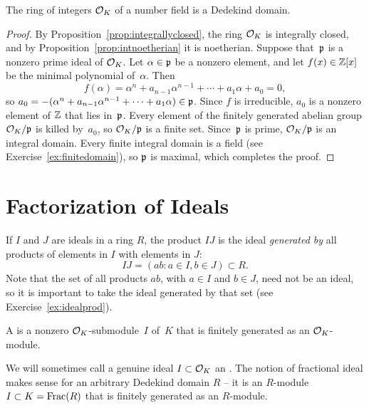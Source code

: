 \begin{proposition}
The ring of integers $\mathcal{O}_K$ of a number field is a Dedekind domain.
\end{proposition}
\begin{proof}
By Proposition~\ref{prop:integrallyclosed}, the ring $\mathcal{O}_K$ is
integrally closed, and by Proposition~\ref{prop:intnoetherian} it is
noetherian.  Suppose that~$\mathfrak{p}$ is a nonzero prime ideal of $\mathcal{O}_K$.
Let $\alpha\in \mathfrak{p}$ be a nonzero element, and let $f(x)\in\mathbb{Z}[x]$ be the
minimal polynomial of~$\alpha$.  Then
$$f(\alpha)=\alpha^n+a_{n-1}\alpha^{n-1}+\cdots+a_1\alpha+a_0=0,$$ so
$a_0 = -(\alpha^n+a_{n-1}\alpha^{n-1}+\cdots+a_1\alpha)\in \mathfrak{p}$.  Since
$f$ is irreducible, $a_0$ is a nonzero element of $\mathbb{Z}$ that lies
in~$\mathfrak{p}$.  Every element of the finitely generated abelian group
$\mathcal{O}_K/\mathfrak{p}$ is killed by~$a_0$, so $\mathcal{O}_K/\mathfrak{p}$ is a finite set.
Since~$\mathfrak{p}$ is prime, $\mathcal{O}_K/\mathfrak{p}$ is an integral domain.  Every finite
integral domain is a field (see Exercise~\ref{ex:finitedomain}), so
$\mathfrak{p}$ is maximal, which completes the proof.
\end{proof}

\section{Factorization of Ideals}

If $I$ and $J$ are ideals in a ring $R$, the product $IJ$ is the ideal
{\em generated by} all products of elements in $I$ with elements in $J$:
$$
  IJ = (ab : a\in I, b\in J) \subset R.
$$
Note that the set of all products $ab$, with $a\in I$ and $b\in J$,
need not be an ideal, so it is important to take the ideal generated
by that set (see Exercise~\ref{ex:idealprod}).

\begin{definition}\label{def:fracideal}
A  is a nonzero $\mathcal{O}_K$-submodule~$I$ of~$K$ that
is finitely generated as an $\mathcal{O}_K$-module.
\end{definition}
We will sometimes call a genuine ideal $I\subset \mathcal{O}_K$ an
.  The notion of fractional ideal makes
sense for an arbitrary Dedekind domain $R$ -- it is an
$R$-module $I\subset K=\operatorname{Frac}(R)$ that is finitely
generated as an $R$-module.


